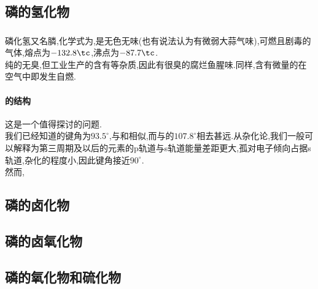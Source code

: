 \documentclass{ctexart}
\begin{document}
\subsection{磷的氢化物}
\subsubsection{}
\begin{substance}[\ce{PH3}]
    磷化氢又名膦,化学式为,是无色无味(也有说法认为有微弱大蒜气味),可燃且剧毒的气体,熔点为$-132.8\tc$,沸点为$-87.7\tc$.\\
    纯的无臭,但工业生产的含有等杂质,因此有很臭的腐烂鱼腥味.同样,含有微量的在空气中即发生自燃.
\end{substance}
\paragraph{的结构}
这是一个值得探讨的问题.\\
\indent 我们已经知道的键角为$93.5^\circ$,与和相似,而与的$107.8^\circ$相去甚远.从杂化论,我们一般可以解释为第三周期及以后的元素的p轨道与s轨道能量差距更大,孤对电子倾向占据s轨道,杂化的程度小,因此键角接近$90^\circ$.\\
\indent 然而,
\subsubsection{}
\subsection{磷的卤化物}
\subsubsection{}
\subsubsection{}
\subsubsection{}
\subsection{磷的卤氧化物}
\subsection{磷的氧化物和硫化物}
\end{document}
